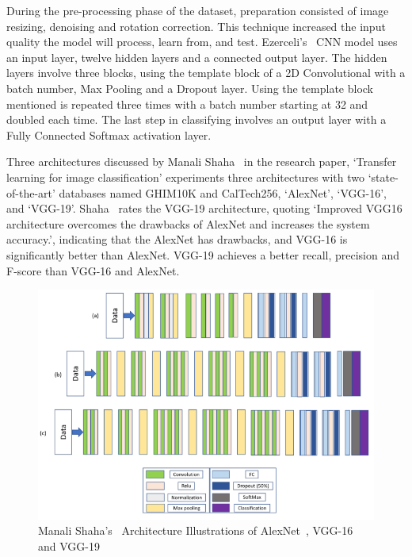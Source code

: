 \documentclass[conference]{IEEEtran}
\begin{document}
      During the pre-processing phase of the dataset, preparation consisted of image resizing, denoising and rotation correction. This technique increased the input quality the model will process, learn from, and test. Ezerceli's~\cite{ezerceli_convolutional_2022} CNN model uses an input layer, twelve hidden layers and a connected output layer. The hidden layers involve three blocks, using the template block of a 2D Convolutional with a batch number, Max Pooling and a Dropout layer. Using the template block mentioned is repeated three times with a batch number starting at 32 and doubled each time. The last step in classifying involves an output layer with a Fully Connected Softmax activation layer.

      Three architectures discussed by Manali Shaha~\cite{shaha_transfer_2018} in the research paper, `Transfer learning for image classification' experiments three architectures with two `state-of-the-art' databases named GHIM10K and CalTech256, `AlexNet', `VGG-16', and `VGG-19'. Shaha~\cite{shaha_transfer_2018} rates the VGG-19 architecture, quoting `Improved VGG16 architecture overcomes the drawbacks of AlexNet and increases the system accuracy.', indicating that the AlexNet has drawbacks, and VGG-16 is significantly better than AlexNet. VGG-19 achieves a better recall, precision and F-score than VGG-16 and AlexNet. 

      \begin{figure}[htp]
        \centering
        \includegraphics[width=\columnwidth]{Figures/Architectures.png}
        \caption{Manali Shaha's~\cite{shaha_transfer_2018} Architecture Illustrations of AlexNet~\cite{krizhevsky_imagenet_2012}, VGG-16~\cite{simonyan_very_2015} and VGG-19~\cite{simonyan_very_2015}}
        \label{fig:shahasIllustrationCNNArchitectures}
      \end{figure}
      
\end{document}
